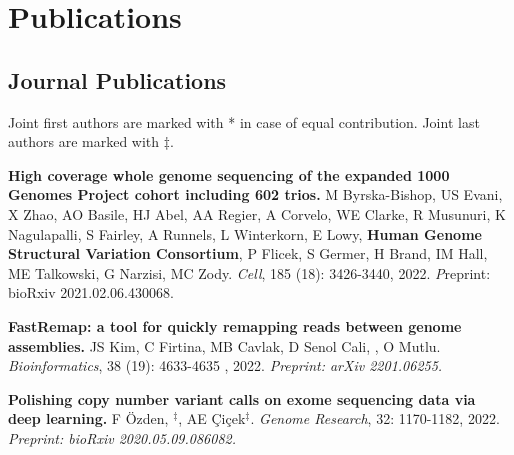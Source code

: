 \section{\sc Publications}
                                       
                                       \vspace{-0.5cm}
                                       
                                       \subsection{\small \sc Journal Publications}
                                       \vspace{-0.6cm}
                                       
                                       \small{
                                         Joint first authors are marked with * in case of equal contribution. Joint last authors are marked with $\ddag$.
                                       }


\vspace{-.2cm}
{\bf High coverage whole genome sequencing of the expanded 1000 Genomes Project cohort including 602 trios.}  M Byrska-Bishop, US Evani, X Zhao, AO Basile, HJ Abel, AA Regier, A Corvelo, WE Clarke, R Musunuri, K Nagulapalli, S Fairley, A Runnels, L Winterkorn, E Lowy, \textbf{Human Genome Structural Variation Consortium}, P Flicek, S Germer, H Brand, IM Hall, ME Talkowski,  G Narzisi, MC Zody. {\it Cell}, 185 (18): 3426-3440, 2022.
{\textit Preprint: bioRxiv 2021.02.06.430068}.\\
         \hspace*{1cm}
          {\footnotesize \em {}}



\vspace{-.2cm}
{\bf FastRemap: a tool for quickly remapping reads between genome assemblies.}
JS Kim, C Firtina, MB Cavlak, D Senol Cali, \calkan{}, O Mutlu.
{\it Bioinformatics}, 38 (19): 4633-4635 , 2022. \textit {Preprint: arXiv 2201.06255.}

\vspace{-.2cm}
{\bf Polishing copy number variant calls on exome sequencing data via deep learning.}
F Özden, \calkan{}$^\ddag$, AE Çiçek$^\ddag$. {\it Genome Research}, 32: 1170-1182, 2022. \textit {Preprint: bioRxiv 2020.05.09.086082.}


